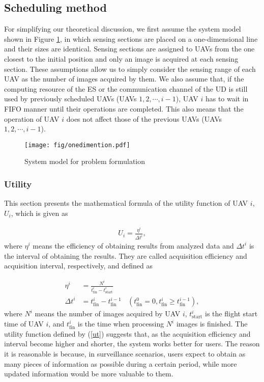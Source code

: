 \documentclass{ieeeaccess}
\begin{document}
\subsection{Scheduling method}\label{math}
For simplifying our theoretical discussion, we first assume the system model shown in Figure \ref{model1.5}, in which sensing sections are placed on a one-dimensional line and their sizes are identical.
%
Sensing sections are assigned to UAVs from the one closest to the initial position and only an image is acquired at each sensing section.
%
These assumptions allow us to simply consider the sensing range of each UAV as the number of images acquired by them.
%
We also assume that, if the computing resource of the ES or the communication channel of the UD is still used by previously scheduled UAVs (UAVs $1, 2, \cdots, i-1$), UAV $i$ has to wait in FIFO manner until their operations are completed.
%
This also means that the operation of UAV $i$ does not affect those of the previous UAVs (UAVs $1, 2, \cdots, i-1$).

\begin{figure}[t]
\begin{center}
\texttt{[image: fig/onedimention.pdf]}
\caption{System model for problem formulation}
\label{model1.5}
\end{center}
\end{figure}

\subsubsection{Utility}\label{to}
This section presents the mathematical formula of the utility function of UAV $i$, $U_i$, which is given as

\begin{align}
U_i = \frac{\eta^i}{{\Delta{t}}^i}, \label{ut}
\end{align}
where $\eta^i$ means the efficiency of obtaining results from analyzed data and ${\Delta{t}}^i$ is the interval of obtaining the results.
%
They are called acquisition efficiency and acquisition interval, respectively, and defined as

\begin{align}
\eta^i&=\frac{N^i}{{t_{\mathrm{fin}}^i}-{t_{\mathrm{start}}^i}} \label{f1}\\
{\Delta{t}}^i &= {t_{\mathrm{fin}}^i}-t_{\mathrm{fin}}^{i-1}~~~~(t_ {\mathrm{fin}}^0=0, {t_{\mathrm{fin}}^i}\geq{t_{\mathrm{fin}}^{i-1}}), \label{f2}
\end{align}
where $N^i$ means the number of images acquired by UAV $i$, $t_{\mathrm{start}}^i$ is the flight start time of UAV $i$, and $t_{\mathrm{fin}}^i$ is the time when processing $N^i$ images is finished. The utility function defined by (\ref{ut}) suggests that, as the acquisition efficiency and interval become higher and shorter, the system works better for users. The reason it is reasonable is because, in surveillance scenarios, users expect to obtain as many pieces of information as possible during a certain period, while more updated information would be more valuable to them.
\end{document}
